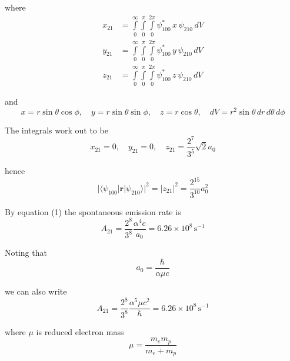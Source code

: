 where
\begin{align*}
x_{21}&=\int\limits_{0}^{\infty}\int\limits_{0}^{\pi}\int\limits_{0}^{2\pi}
\psi_{100}^*\,x\,\psi_{210}\,dV
\\
y_{21}&=\int\limits_{0}^{\infty}\int\limits_{0}^{\pi}\int\limits_{0}^{2\pi}
\psi_{100}^*\,y\,\psi_{210}\,dV
\\
z_{21}&=\int\limits_{0}^{\infty}\int\limits_{0}^{\pi}\int\limits_{0}^{2\pi}
\psi_{100}^*\,z\,\psi_{210}\,dV
\end{align*}

and
\begin{equation*}
x=r\sin\theta\cos\phi,
\quad
y=r\sin\theta\sin\phi,
\quad
z=r\cos\theta,
\quad
dV=r^2\sin\theta\,dr\,d\theta\,d\phi
\end{equation*}

The integrals work out to be
\begin{equation*}
x_{21}=0,
\quad
y_{21}=0,
\quad
z_{21}=\frac{2^7}{3^5}\sqrt2a_0
\end{equation*}

hence
\begin{equation*}
\bigl|\langle\psi_{100}|\mathbf r|\psi_{210}\rangle\bigr|^2=|z_{21}|^2=\frac{2^{15}}{3^{10}}a_0^2
\end{equation*}

By equation (1) the spontaneous emission rate is
\begin{equation*}
A_{21}=\frac{2^8}{3^8}\frac{\alpha^4c}{a_0}=6.26\times10^8\,\text{s}^{-1}
\end{equation*}

Noting that
\begin{equation*}
a_0=\frac{\hbar}{\alpha\mu c}
\end{equation*}

we can also write
\begin{equation*}
A_{21}=\frac{2^8}{3^8}\frac{\alpha^5\mu c^2}{\hbar}=6.26\times10^8\,\text{s}^{-1}
\end{equation*}

where $\mu$ is reduced electron mass
\begin{equation*}
\mu=\frac{m_em_p}{m_e+m_p}
\end{equation*}


